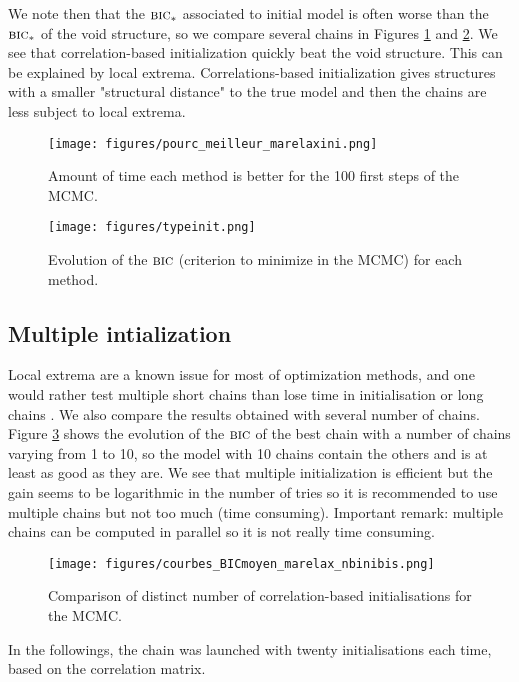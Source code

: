 \documentclass[12pt,a4paper]{report}
\begin{document}
		We note then that the $\mbox{{\sc bic}}_*$ associated to initial model is often worse than the $\mbox{{\sc bic}}_*$ of the void structure, so we compare several chains in Figures \ref{pourcini} and \ref{Bicini}.			
				We see that correlation-based initialization quickly beat the void structure. This can be explained by local extrema. Correlations-based initialization gives structures with a smaller "structural distance" to the true model and then the chains are less subject to local extrema.

	\begin{center}
		\begin{figure}[h!]
		\centering
		\texttt{[image: figures/pourc\_meilleur\_marelaxini.png]} 
		\caption{Amount of time each method is better for the 100 first steps of the MCMC. } \label{pourcini}
		\end{figure}		
	\end{center}
	
	\begin{center}
		\begin{figure}[h!]
		\centering
		\texttt{[image: figures/typeinit.png]} %
		\caption{Evolution of the $\mbox{{\sc bic}}$ (criterion to minimize in the MCMC) for each method.}\label{Bicini}
		\end{figure}
	\end{center}
	\FloatBarrier
		\subsection{Multiple intialization}	
		Local extrema are a known issue for most of optimization methods, and one would rather test multiple short chains than lose time in initialisation or long chains \cite{gilks1996markov}. 
		We also compare the results obtained with several number of chains. Figure \ref{nbini} shows the evolution of the $\mbox{{\sc bic}}$ of the best chain with a number of chains varying from 1 to 10, so the model with 10 chains contain the others and is at least as good as they are. We see that multiple initialization is efficient but the gain seems to be logarithmic in the number of tries so it is recommended to use multiple chains but not too much (time consuming). Important remark: multiple chains can be computed in parallel so it is not really time consuming.		
			
	\begin{center}
	\begin{figure}[h!]
	\centering
		\texttt{[image: figures/courbes\_BICmoyen\_marelax\_nbinibis.png]} 
		\caption{Comparison of distinct number of correlation-based initialisations for the MCMC.}\label{nbini}
	\end{figure}
	\end{center}
		In the followings, the chain was launched with twenty initialisations each time, based on the correlation matrix.
\end{document}
